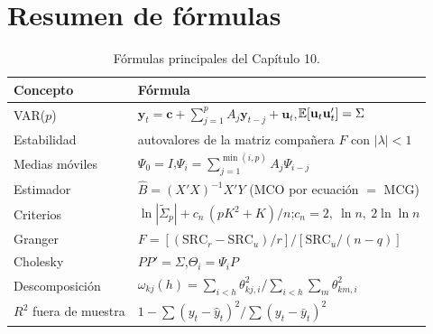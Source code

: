 \section{Resumen de fórmulas}

\begin{table}[H]
\centering\small
\begin{tabular}{@{}ll@{}}
\toprule
Concepto & Fórmula \\
\midrule
VAR($p$) & $\mathbf y_t=\mathbf c+\sum_{j=1}^{p}A_j\mathbf y_{t-j}+\mathbf u_t$,\quad $\mathbb{E}[\mathbf u_t\mathbf u_t']=\Sigma$ \\
Estabilidad & autovalores de la matriz compañera $F$ con $|\lambda|<1$ \\
Medias móviles & $\Psi_0=I$,\quad $\Psi_i=\sum_{j=1}^{\min(i,p)}A_j\Psi_{i-j}$ \\
Estimador & $\hat B=(X'X)^{-1}X'Y$ (MCO por ecuación $=$ MCG) \\
Criterios & $\ln|\tilde\Sigma_p|+c_n\,(pK^2+K)/n$;\quad $c_n=2,\ \ln n,\ 2\ln\ln n$ \\
Granger & $F=[(\mathrm{SRC}_r-\mathrm{SRC}_u)/r]/[\mathrm{SRC}_u/(n-q)]$ \\
Cholesky & $PP'=\Sigma$,\quad $\Theta_i=\Psi_iP$ \\
Descomposición & $\omega_{kj}(h)=\sum_{i<h}\theta_{kj,i}^2\big/\sum_{i<h}\sum_m\theta_{km,i}^2$ \\
$R^2$ fuera de muestra & $1-\sum(y_t-\hat y_t)^2/\sum(y_t-\bar y_t)^2$ \\
\bottomrule
\end{tabular}
\caption{Fórmulas principales del Capítulo 10.}
\end{table}

